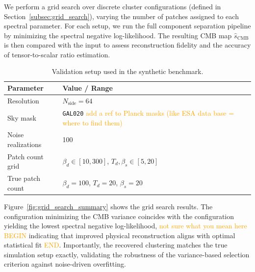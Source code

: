 \documentclass[fleqn,usenatbib]{mnras}
\newcommand{\je}[1]{\textcolor{orange}{#1}}
\begin{document}
We perform a grid search over discrete cluster configurations (defined in Section~\ref{subsec:grid_search}), varying the number of patches assigned to each spectral parameter. For each setup, we run the full component separation pipeline by minimizing the spectral negative log-likelihood. The resulting CMB map \( \hat{s}_{\mathrm{CMB}} \) is then compared with the input to assess reconstruction fidelity and the accuracy of tensor-to-scalar ratio estimation.

\begin{table}
    \centering
    \small
    \caption{Validation setup used in the synthetic benchmark.}
    \label{tab:validation_config}
    \begin{tabular}{@{}p{3.5cm}|p{5cm}@{}}
        \toprule
        \textbf{Parameter} & \textbf{Value / Range} \\
        \midrule
        Resolution & \( N_{\text{side}} = 64 \) \\
        Sky mask & \texttt{GAL020} \je{add a ref to Planck masks (like ESA data base = where to find them)}\\
        Noise realizations & 100 \\
        Patch count grid & \( \beta_d \in [10, 300] \), \( T_d, \beta_s \in [5, 20] \) \\
        True patch count & \( \beta_d = 100 \), \( T_d = 20 \), \( \beta_s = 20 \) \\
        \bottomrule
    \end{tabular}
\end{table}


Figure~\ref{fig:grid_search_summary} shows the grid search results. The configuration minimizing the CMB variance coincides with the configuration yielding the lowest spectral negative log-likelihood, \je{not sure what you mean here BEGIN} indicating that improved physical reconstruction aligns with optimal statistical fit \je{END}. Importantly, the recovered clustering matches the true simulation setup exactly, validating the robustness of the variance-based selection criterion against noise-driven overfitting.
\end{document}
